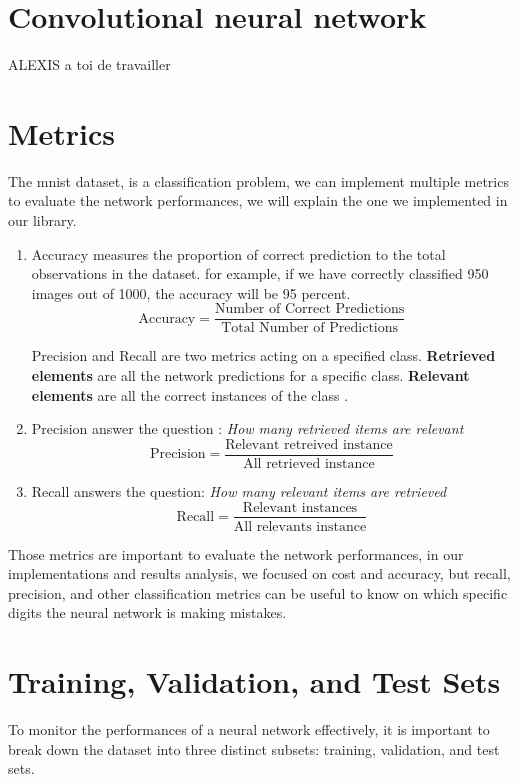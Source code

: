 \documentclass[a4paper, twocolumn, twoside]{article}
\begin{document}
	\section{Convolutional neural network}
	ALEXIS a toi de travailler

	\section{Metrics}
	The mnist dataset, is a classification problem, we can implement multiple metrics
	to evaluate the network performances, we will explain the one we implemented in our library.

	\begin{enumerate}
		\item Accuracy measures the proportion of correct prediction to the total observations in the dataset.
		for example, if we have correctly classified 950 images out of 1000, the accuracy will be 95 percent.
		$$
		\text{Accuracy} = \frac{\text{Number of Correct Predictions}}{\text{Total Number of Predictions}}
		$$

		Precision and Recall are two metrics acting on a specified class.
		\textbf{Retrieved elements} are all the network predictions for a specific class.
		\textbf{Relevant elements} are all the correct instances of 
		the class \cite{wiki_precision_recall}.

		\item Precision answer the question : \textit{How many retrieved items are relevant}
		$$
		\text{Precision} = \frac{\text{Relevant retreived instance}}{\text{All retrieved instance}}
		$$
		\item Recall answers the question: \textit{How many relevant items are retrieved}
		$$
		\text{Recall} = \frac{\text{Relevant instances}}{\text{All relevants instance}}
		$$
	\end{enumerate}

        Those metrics are important to evaluate the network performances, in our implementations and results analysis, we focused on cost and accuracy, but recall, precision, and other classification metrics
        can be useful to know on which specific digits the neural network is making mistakes.

	\section{Training, Validation, and Test Sets}
	To monitor the performances of a neural network effectively,
	it is important to break down the dataset into three distinct subsets:
	training, validation, and test sets.
\end{document}
